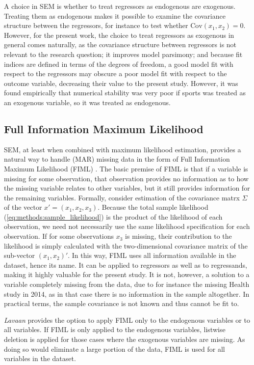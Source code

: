 A choice in SEM is whether to treat regressors as endogenous are exogenous. Treating them as endogenous makes it possible
to examine the covariance structure between the regressors, for instance to test whether $\text{Cov}(x_1, x_2) = 0$.
However, for the present work, the choice to treat regressors as exogenous in general comes naturally,
as the covariance structure between regressors is not relevant to the research question; it improves model parsimony;
and because fit indices are defined in terms of the degrees of freedom,
a good model fit with respect to the regressors may obscure a poor model fit with respect to the outcome variable,
decreasing their value to the present study.
However, it was found empirically that numerical stability was very poor if sports was treated as an exogenous variable,
so it was treated as endogenous.

\subsection{Full Information Maximum Likelihood}
\label{sec:methods:fiml}
SEM, at least when combined with maximum likelihood estimation, provides a natural way to handle (MAR) missing data in the
form of Full Information Maximum Likelihood (FIML) \cite{arbuckle2013full}.
The basic premise of FIML is that if a variable is missing for some observation, that observation provides no information
as to how the missing variable relates to other variables, but it still provides information for the remaining variables.
Formally, consider estimation of the covariance matrx $\Sigma$ of the vector $x' = (x_1, x_2, x_3)$.
Because the total sample likelihood (\cref{eq:methods:sample_likelihood}) is the product of the likelihood of each observation,
we need not necessarily use the same likelihood specification for each observation.
If for some observations $x_3$ is missing, their contribution to the likelihood is simply calculated with the two-dimensional
covariance matrix of the sub-vector $(x_1, x_2)'$.
In this way, FIML uses all information available in the dataset, hence its name. It can be applied to regressors
as well as to regressands, making it highly valuable for the present study.
It is not, however, a solution to a variable completely missing from the data, due to for instance the missing Health
study in 2014, as in that case there is no information in the sample altogether. In practical terms, the sample covariance
is not known and thus cannot be fit to.

\textit{Lavaan} provides the option to apply FIML only to the endogenous variables or to all variables.
If FIML is only applied to the endogenous variables, listwise deletion is applied for those cases where the exogenous
variables are missing. As doing so would eliminate a large portion of the data, FIML is used for all variables in the dataset.

